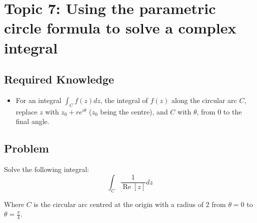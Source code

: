 \documentclass[12pt]{article}
\renewcommand{\Re}{\operatorname{Re}}
\begin{document}
\section{Topic 7: Using the parametric circle formula to solve a complex integral}
\subsection{Required Knowledge}
\begin{itemize}
    \item For an integral $\int_{C}{f(z)dz}$, the integral of $f(z)$ along the circular arc $C$, replace $z$ with $z_0+re^{i\theta}$ ($z_0$ being the centre), and $C$ with $\theta$, from 0 to the final angle.
\end{itemize}
\subsection{Problem}
Solve the following integral:
\begin{equation}
    \int_C{\frac{1}{\Re[z]}}dz
\end{equation}

Where $C$ is the circular arc centred at the origin with a radius of 2 from $\theta=0$ to $\theta=\frac{\pi}{4}$.
\end{document}
